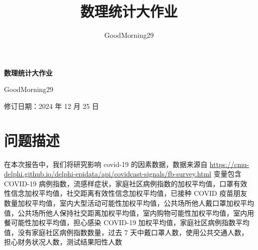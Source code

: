 \documentclass[UTF8,ctexart,a4paper,11pt,openany]{article}
\title{数理统计大作业}
\author{GoodMorning29}
\theoremstyle{definition}
\begin{document}
\begin{center}
{\huge \textbf{数理统计大作业}}

{\large GoodMorning29}

修订日期：2024 年 12 月 25 日
\end{center}

\section{问题描述}
在本次报告中，我们将研究影响 covid-19 的因素数据，数据来源自
\url{https://cmu-delphi.github.io/delphi-epidata/api/covidcast-signals/fb-survey.html}
变量包含 COVID-19 病例指数，流感样症状，家庭社区病例指数的加权平均值，口罩有效性信念加权平均值，社交距离有效性信念加权平均值，已接种 COVID 疫苗朋友数量加权平均值，室内大型活动可能性加权平均值，公共场所他人戴口罩加权平均值，公共场所他人保持社交距离加权平均值，室内购物可能性加权平均值，室内用餐可能性加权平均值，担心感染 COVID-19 加权平均值，家庭社区病例指数平均值，没有家庭社区病例指数数量，过去 7 天中戴口罩人数，使用公共交通人数，担心财务状况人数，测试结果阳性人数
\end{document}
